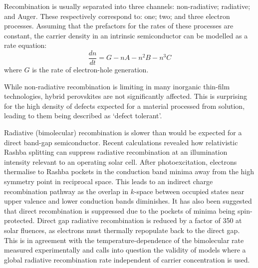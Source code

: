 Recombination is usually separated into three channels: 
non-radiative; radiative; and Auger. 
These respectively correspond to: one; two; and three electron processes.
Assuming that the prefactors for the rates of these processes are constant, the carrier density in an intrinsic semiconductor can be modelled as a rate equation:
%
\begin{equation}
\frac{dn}{dt} = G - nA - n^2B - n^3C
\end{equation}
%
where $G$ is the rate of electron-hole generation.

While non-radiative recombination is limiting in many inorganic thin-film technologies, hybrid perovskites are not significantly affected. 
This is surprising for the high density of defects expected
for a material processed from solution, leading to them being described as `defect tolerant'. \autocite{Berry2016}

%

Radiative (bimolecular) recombination is slower than would be expected for a direct band-gap semiconductor. 
%
Recent calculations\autocite{Azarhoosh2016, Zheng2015} revealed how relativistic Rashba splitting can suppress radiative recombination at an illumination intensity relevant to an operating solar cell.
After photoexcitation, electrons thermalise to Rashba pockets in the conduction band minima away from the high symmetry point in reciprocal space.
This leads to an indirect charge recombination pathway as the overlap in $k$-space between occupied states near upper valence and lower conduction bands diminishes.
It has also been suggested that direct recombination is suppressed due to the pockets of minima being spin-protected.\autocite{Zheng2015}
Direct gap radiative recombination is reduced by a factor of 350 at solar fluences, as electrons must thermally repopulate back to the direct gap.\autocite{Azarhoosh2016}
This is in agreement with the temperature-dependence of the bimolecular rate measured experimentally \autocite{Hutter2016a} and calls into question the validity of models where a global radiative recombination rate independent of carrier concentration is used.

